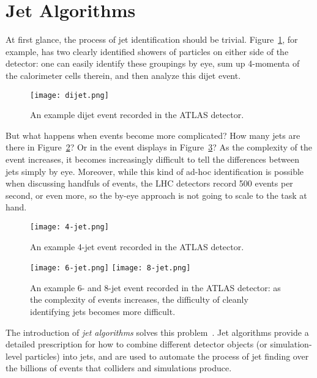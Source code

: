\section{Jet Algorithms}

At first glance, the process of jet identification should be trivial. Figure~\ref{fig:jets:dijet}, for example, has two clearly identified showers of particles on either side of the detector: one can easily identify these groupings by eye, sum up 4-momenta of the calorimeter cells therein, and then analyze this dijet event.



\begin{figure}
\centering
\texttt{[image: dijet.png]}
\caption{An example dijet event recorded in the ATLAS detector.}
\label{fig:jets:dijet}
\end{figure}


But what happens when events become more complicated? How many jets are there in Figure~\ref{fig:jets:4-jet}? Or in the event displays in Figure~\ref{fig:jets:many-jet}? As the complexity of the event increases, it becomes increasingly difficult to tell the differences between jets simply by eye. Moreover, while this kind of ad-hoc identification is possible when discussing handfuls of events, the LHC detectors record 500 events per second, or even more, so the by-eye approach is not going to scale to the task at hand. 


\begin{figure}
\centering
\texttt{[image: 4-jet.png]}
\caption{An example 4-jet event recorded in the ATLAS detector.}
\label{fig:jets:4-jet}
\end{figure}




\begin{figure}
\centering
\texttt{[image: 6-jet.png]}
\texttt{[image: 8-jet.png]}
\caption{An example 6- and 8-jet event recorded in the ATLAS detector: as the complexity of events increases, the difficulty of cleanly identifying jets becomes more difficult.}
\label{fig:jets:many-jet}
\end{figure}



The introduction of \textit{jet algorithms} solves this problem~\cite{Jetography}. Jet algorithms provide a detailed prescription for how to combine different detector objects (or simulation-level particles) into jets, and are used to automate the process of jet finding over the billions of events that colliders and simulations produce.

